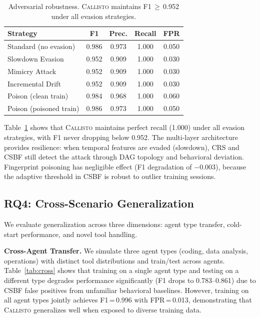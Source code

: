 \documentclass[conference,compsoc]{IEEEtran}
\newcommand{\system}{\textsc{Callisto}}
\begin{document}
\begin{table}[t]
\centering
\caption{Adversarial robustness. \system{} maintains F1\,$\geq$\,0.952 under all evasion strategies.}
\label{tab:adversarial}
\small
\begin{tabular}{@{}lcccc@{}}
\toprule
Strategy & F1 & Prec. & Recall & FPR \\
\midrule
Standard (no evasion) & 0.986 & 0.973 & 1.000 & 0.050 \\
Slowdown Evasion & 0.952 & 0.909 & 1.000 & 0.030 \\
Mimicry Attack & 0.952 & 0.909 & 1.000 & 0.030 \\
Incremental Drift & 0.952 & 0.909 & 1.000 & 0.030 \\
\midrule
Poison (clean train) & 0.984 & 0.968 & 1.000 & 0.060 \\
Poison (poisoned train) & 0.986 & 0.973 & 1.000 & 0.050 \\
\bottomrule
\end{tabular}
\end{table}

Table~\ref{tab:adversarial} shows that \system{} maintains perfect recall (1.000) under all evasion strategies, with F1 never dropping below 0.952. The multi-layer architecture provides resilience: when temporal features are evaded (slowdown), CRS and CSBF still detect the attack through DAG topology and behavioral deviation. Fingerprint poisoning has negligible effect (F1 degradation of $-$0.003), because the adaptive threshold in CSBF is robust to outlier training sessions.

\subsection{RQ4: Cross-Scenario Generalization}
\label{sec:cross}

We evaluate generalization across three dimensions: agent type transfer, cold-start performance, and novel tool handling.

\textbf{Cross-Agent Transfer.} We simulate three agent types (coding, data analysis, operations) with distinct tool distributions and train/test across agents. Table~\ref{tab:cross} shows that training on a single agent type and testing on a different type degrades performance significantly (F1 drops to 0.783--0.861) due to CSBF false positives from unfamiliar behavioral baselines. However, training on all agent types jointly achieves F1\,=\,0.996 with FPR\,=\,0.013, demonstrating that \system{} generalizes well when exposed to diverse training data.
\end{document}
